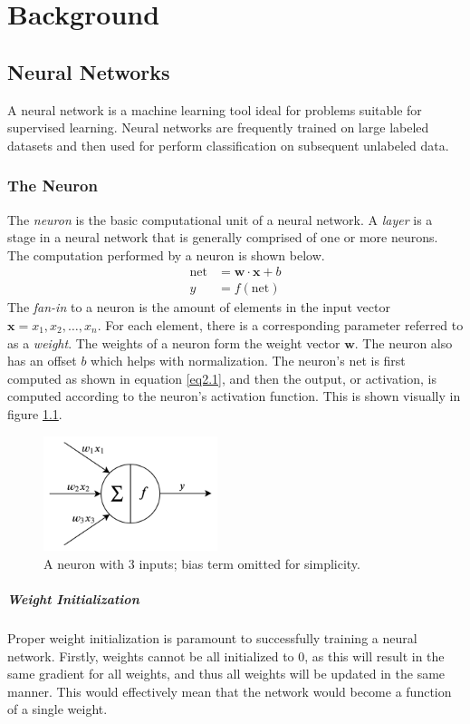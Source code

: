 \chapter{Background}\label{background}
\section{Neural Networks}
A neural network is a machine learning tool ideal for problems suitable for supervised learning. Neural networks are frequently trained on large labeled datasets and then used for perform classification on subsequent unlabeled data.

\subsection{The Neuron}
The \textit{neuron} is the basic computational unit of a neural network. A \textit{layer} is a stage in a neural network that is generally comprised of one or more neurons. The computation performed by a neuron is shown below.
\begin{align}
\text{net} &= \mathbf{w \cdot x} + b\label{eq2.1}\\
y &= f(\text{net})
\end{align}
The \textit{fan-in} to a neuron is the amount of elements in the input vector $\mathbf{x} = x_1, x_2, \ldots, x_n$. For each element, there is a corresponding parameter referred to as a \textit{weight}. The weights of a neuron form the weight vector $\mathbf{w}$. The neuron also has an offset $b$ which helps with normalization. The neuron's net is first computed as shown in equation \ref{eq2.1}, and then the output, or activation, is computed according to the neuron's activation function. This is shown visually in figure \ref{neuron}.
\begin{figure}
	\centering
	\includegraphics[width=2in]{figures/neuron}
	\caption{A neuron with 3 inputs; bias term omitted for simplicity.}\label{neuron}
\end{figure}

\paragraph{Weight Initialization}
Proper weight initialization is paramount to successfully training a neural network. Firstly, weights cannot be all initialized to 0, as this will result in the same gradient for all weights, and thus all weights will be updated in the same manner. This would effectively mean that the network would become a function of a single weight.

